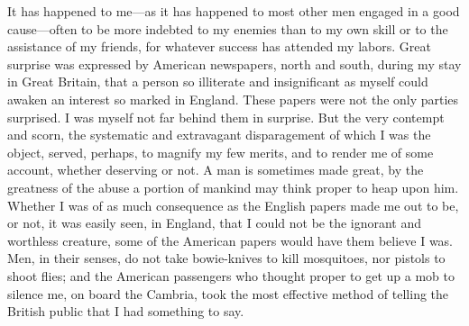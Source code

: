 It has happened to me---as it has happened to most other men engaged in
a good cause---often to be more indebted to my enemies than to my own
skill or to the assistance of my friends, for whatever success has
attended my labors. Great surprise was expressed by American newspapers,
north and south, during my stay in Great Britain, that a person so
illiterate and insignificant as myself could awaken an interest so
marked in England. These papers were not the only parties surprised. I
was myself not far behind them in surprise. But the very contempt and
scorn, the systematic and extravagant disparagement of which I was the
object, served, perhaps, to magnify {}my few merits, and to render me of
some account, whether deserving or not. A man is sometimes made great,
by the greatness of the abuse a portion of mankind may think proper to
heap upon him. Whether I was of as much consequence as the English
papers made me out to be, or not, it was easily seen, in England, that I
could not be the ignorant and worthless creature, some of the American
papers would have them believe I was. Men, in their senses, do not take
bowie-knives to kill mosquitoes, nor pistols to shoot flies; and the
American passengers who thought proper to get up a mob to silence me, on
board the Cambria, took the most effective method of telling the British
public that I had something to say.


